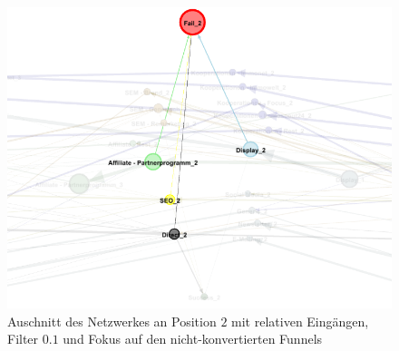 \begin{figure}[H]
	\centering\includegraphics[scale=0.35]{in_filter_10_fail.png}\caption[Relative Eingänge mit Filter $0.1$ und Fokus auf Nicht-Konvertierten]{Auschnitt des Netzwerkes an Position $2$ mit relativen Eingängen, Filter $0.1$ und Fokus auf den nicht-konvertierten Funnels}\label{in_filter_10_fail}
\end{figure}
